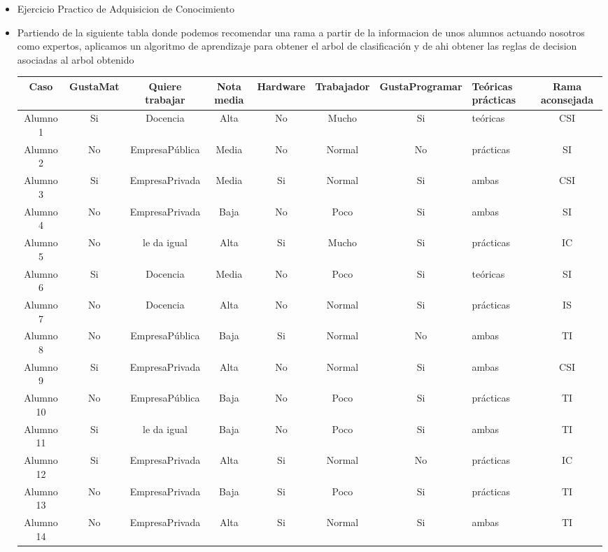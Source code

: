 \documentclass[11pt]{article}
\begin{document}
\begin{itemize}
  \item Ejercicio Practico de Adquisicion de Conocimiento
  \item[] Partiendo de la siguiente tabla donde podemos recomendar una rama a partir de la informacion de unos alumnos actuando nosotros como expertos, aplicamos un algoritmo de aprendizaje para obtener el 
  arbol de clasificación y de ahi obtener las reglas de decision asociadas al arbol obtenido

  \begin{table}[htbp]
    \centering
    \small
    \setlength\tabcolsep{0.75pt}
    \begin{center}
    \begin{tabular}{|c|c|c|c|c|c|c|p{15mm}|c| }
      \hline
    Caso  &  GustaMat  & Quiere trabajar  & Nota media & Hardware &Trabajador & GustaProgramar & Teóricas \newline prácticas  & Rama aconsejada\\ \hline  
    Alumno 1 & Si & Docencia & Alta & No & Mucho & Si & teóricas & CSI\\
    Alumno 2 & No & EmpresaPública & Media & No & Normal & No & prácticas & SI\\
    Alumno 3 & Si & EmpresaPrivada & Media & Si & Normal & Si & ambas & CSI\\
    Alumno 4  & No & EmpresaPrivada & Baja & No & Poco & Si & ambas & SI\\
    Alumno 5 & No & le da igual & Alta & Si & Mucho & Si & prácticas & IC\\
    Alumno 6 & Si & Docencia & Media & No & Poco & Si & teóricas & SI\\
    Alumno 7 & No & Docencia & Alta & No & Normal & Si & prácticas & IS\\
    Alumno 8 & No & EmpresaPública & Baja & Si & Normal & No & ambas & TI\\
    Alumno 9 & Si & EmpresaPrivada & Alta & No & Normal & Si & ambas & CSI\\
    Alumno 10 & No & EmpresaPública & Baja & No & Poco & Si & prácticas & TI\\
    Alumno 11 & Si & le da igual & Baja & No & Poco & Si & ambas & TI\\
    Alumno 12 & Si & EmpresaPrivada & Alta & Si & Normal & No & prácticas & IC\\
    Alumno 13 & No & EmpresaPrivada & Baja & Si & Poco & Si & prácticas & TI\\
    Alumno 14 & No & EmpresaPrivada & Alta & Si & Normal & Si & ambas & TI\\

\end{tabular}
\end{center}
\end{table}
\end{itemize}
\end{document}
